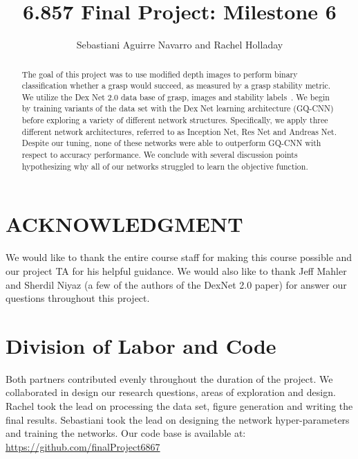 \documentclass[letterpaper, 10 pt, conference]{../ieeeconf}
\begin{document}
\title{6.857 Final Project: Milestone 6}
\author{Sebastiani Aguirre Navarro and Rachel Holladay}
\maketitle

\begin{abstract}
The goal of this project was to use modified depth images to perform binary classification whether a grasp would succeed, as measured by a grasp stability metric. 
We utilize the Dex Net 2.0 data base of grasp, images and stability labels~\cite{mahler2017dex}.
We begin by training variants of the data set with the Dex Net learning architecture (GQ-CNN) before exploring a variety of different network structures. 
Specifically, we apply three different network architectures, referred to as Inception Net, Res Net and Andreas Net. 
Despite our tuning, none of these networks were able to outperform GQ-CNN with respect to accuracy performance. 
We conclude with several discussion points hypothesizing why all of our networks struggled to learn the objective function. 
\end{abstract}










\section*{ACKNOWLEDGMENT}
We would like to thank the entire course staff for making this course possible and our project TA for his helpful guidance. 
We would also like to thank Jeff Mahler and Sherdil Niyaz (a few of the authors of the DexNet 2.0 paper) for answer our questions throughout this project. 

\section*{Division of Labor and Code}
Both partners contributed evenly throughout the duration of the project. 
We collaborated in design our research questions, areas of exploration and design. Rachel took the lead on processing the data set, figure generation and writing the final results. Sebastiani took the lead on designing the network hyper-parameters and training the networks. 
Our code base is available at: \url{https://github.com/finalProject6867}

{\footnotesize
    
}
\end{document}
